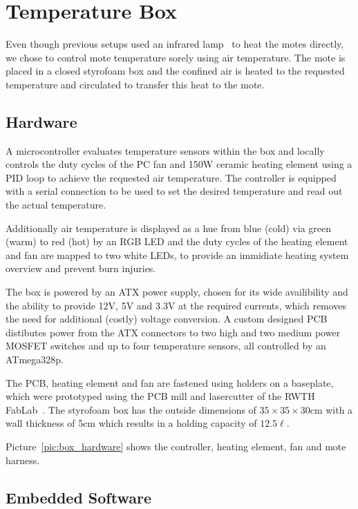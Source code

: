 \section{Temperature Box}

Even though previous setups used an infrared lamp~\cite{Boano2013, Hermans2013} to heat the motes directly, we chose to control mote temperature sorely using air temperature.
The mote is placed in a closed styrofoam box and the confined air is heated to the requested temperature and circulated to transfer this heat to the mote.

\subsection{Hardware}
A microcontroller evaluates temperature sensors within the box and locally controls the duty cycles of the PC fan and 150W ceramic heating element using a PID loop to achieve the requested air temperature.
The controller is equipped with a serial connection to be used to set the desired temperature and read out the actual temperature.

Additionally air temperature is displayed as a hue from blue (cold) via green (warm) to red (hot) by an RGB LED and the duty cycles of the heating element and fan are mapped to two white LEDs, to provide an immidiate heating system overview and prevent burn injuries.

The box is powered by an ATX power supply, chosen for its wide availibility and the ability to provide 12V, 5V and 3.3V at the required currents, which removes the need for additional (costly) voltage conversion.
A custom designed PCB distibutes power from the ATX connectors to two high and two medium power MOSFET switches and up to four temperature sensors, all controlled by an ATmega328p.

The PCB, heating element and fan are fastened using holders on a baseplate, which were prototyped using the PCB mill and lasercutter of the RWTH FabLab~\cite{fablab}.
The styrofoam box has the outside dimensions of $35 \times 35 \times 30$cm with a wall thickness of 5cm which results in a holding capacity of $12.5\ell$.

Picture~\ref{pic:box_hardware} shows the controller, heating element, fan and mote harness.

\subsection{Embedded Software}

